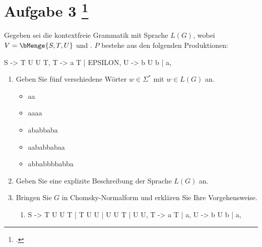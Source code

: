 \documentclass{bschlangaul-aufgabe}
\begin{document}
\let\schrittE=\bChomskyUeberErklaerung

\section{Aufgabe 3
\footcite{examen:66115:2019:03}}

Gegeben sei die kontextfreie Grammatik \bGrammatik{} mit Sprache
$L(G)$, wobei $V = \bMenge{S,T,U}$ und . $P$ bestehe
aus den folgenden Produktionen:

\begin{liProduktionsRegeln}
S -> T U U T,
T -> a T | EPSILON,
U -> b U b | a,
\end{liProduktionsRegeln}
\begin{enumerate}


\item Geben Sie fünf verschiedene Wörter $w \in \Sigma^*$ mit $w \in
L(G)$ an.

\begin{bAntwort}
\begin{itemize}
\item aa
\item aaaa
\item ababbaba
\item aababbabaa
\item abbabbbbabba
\end{itemize}
\end{bAntwort}


\item Geben Sie eine explizite Beschreibung der Sprache $L(G)$ an.

\begin{bAntwort}
\end{bAntwort}


\item Bringen Sie $G$ in Chomsky-Normalform und erklären Sie Ihre
Vorgehensweise.

\begin{bAntwort}
\begin{enumerate}
\item \schrittE{1}

\begin{liProduktionsRegeln}
S -> T U U T | T U U | U U T | U U,
T -> a T | a,
U -> b U b | a,
\end{liProduktionsRegeln}


\end{enumerate}
\end{bAntwort}
\end{enumerate}
\end{document}
